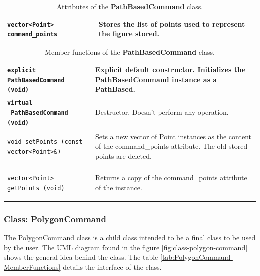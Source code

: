\documentclass[11pt,twoside,openany,x11names,svgnames]{memoir}
\begin{document}
\begin{table}[h]\footnotesize
\centering
\begin{tabular}{| >{\bfseries}p{6.5cm} | p{9cm} |}
	\hline
	
	\texttt{vector<Point> command\_points} & Stores the list of points used to represent the figure stored. \\

	\hline
\end{tabular}
\caption{Attributes of the \textbf{PathBasedCommand} class.}
\label{tab:PathBasedCommand-Attributes}
\end{table}

\begin{table}[h]\footnotesize
\centering
\begin{tabular}{| >{\bfseries}p{8.5cm} | p{7cm} |}
	\hline
	
	\texttt{explicit PathBasedCommand (void)} & Explicit default constructor. Initializes the PathBasedCommand instance as a PathBased. \\
	
	\hline
	
	\texttt{virtual ~PathBasedCommand (void)} & Destructor. Doesn't perform any operation. \\
	
	\hline
	
	\texttt{void setPoints (const vector<Point>\&)} & Sets a new vector of Point instances as the content of the command\_points attribute. The old stored points are deleted. \\
	
	\hline	
	
	\texttt{vector<Point> getPoints (void)} & Returns a copy of the command\_points attribute of the instance. \\
	
	\hline
\end{tabular}
\caption{Member functions of the \textbf{PathBasedCommand} class.}
\label{tab:PathBasedCommand-MemberFunctions}
\end{table}

\clearpage

\subsubsection{Class: PolygonCommand}\label{Class-PolygonCommand}

The PolygonCommand class is a child class intended to be a final class to be used by the user. The UML diagram found in the figure \ref{fig:class-polygon-command} shows the general idea behind the class. The table \ref{tab:PolygonCommand-MemberFunctions} details the interface of the class.
\end{document}
